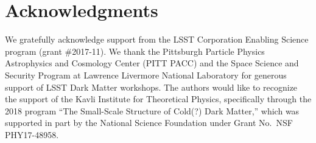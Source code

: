 \chapter*{Acknowledgments}

We gratefully acknowledge support from the LSST Corporation Enabling Science program (grant \#2017-11).
We thank the Pittsburgh Particle Physics Astrophysics and Cosmology Center (PITT PACC) and the Space Science and Security Program at Lawrence Livermore National Laboratory for generous support of LSST Dark Matter workshops. 
The authors would like to recognize the support of the Kavli Institute for Theoretical Physics, specifically through the 2018 program ``The Small-Scale Structure of Cold(?) Dark Matter,'' which was supported in part by the National Science Foundation under Grant No.\ NSF PHY17-48958.









